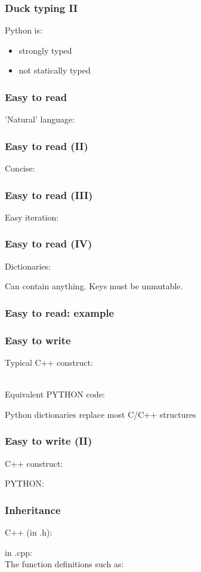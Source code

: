 \documentclass[14pt]{beamer}
\begin{document}
\begin{frame}
\frametitle{Duck typing II}
Python is:
\begin{itemize}
\item strongly typed

\item not statically typed

\end{itemize}
\end{frame}

\begin{frame}
\frametitle{Easy to read}
'Natural' language:

\end{frame}

\begin{frame}
\frametitle{Easy to read (II)}
Concise:

\end{frame}

\begin{frame}
\frametitle{Easy to read (III)}
Easy iteration:

\end{frame}

\begin{frame}
\frametitle{Easy to read (IV)}
Dictionaries:

Can contain anything. Keys must be unmutable.
\end{frame}

\begin{frame}
\frametitle{Easy to read: example}

\end{frame}

\begin{frame}
\frametitle{Easy to write}
Typical C++ construct:

~\\
Equivalent PYTHON code:

Python dictionaries replace most C/C++ structures
\end{frame}

\begin{frame}
\frametitle{Easy to write (II)}
C++ construct:

PYTHON:


\end{frame}

\begin{frame}
\frametitle{Inheritance}
C++ (in .h):

in .cpp:\\
The function definitions such as:

\end{frame}
\end{document}
